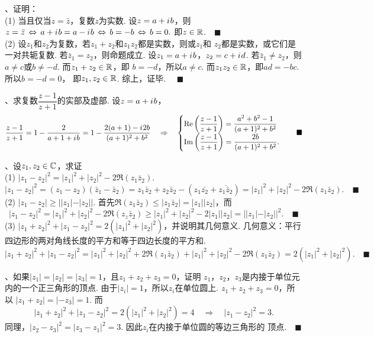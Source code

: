 \vspace{1cm}
\par{}、证明：\\
(1) 当且仅当$z=\bar{z}$，复数$z$为实数.
\proof
  设$z=a+{i\mkern1mu} b$，则
  $
    z=\bar{z}\,\Leftrightarrow\, a+{i\mkern1mu} b = a-{i\mkern1mu} b
    \,\Leftrightarrow\, b = -b \,\Leftrightarrow\, b = 0.
  $
  即$z\in\mathbb{R}$.$\quad\blacksquare$ \\
(2) 设$z_1$和$z_2$为复数，若$z_1+z_2$和$z_1z_2$都是实数，则或$z_1$和
    $z_2$都是实数，或它们是一对共轭复数.
\proof
  若$\bar{z}_1=z_2$，则命题成立. 设$z_1=a+{i\mkern1mu} b$，$z_2=c+{i\mkern1mu} d$.
  若$\bar{z}_1\ne z_2$，则$a\ne c$或$b\ne -d$. 而$z_1+z_2\in\mathbb{R}$，即
  $b = -d$，所以$a\ne c$. 而$z_1z_2\in\mathbb{R}$，即$ad=-bc$. 所以$b=-d=0$，
  即$z_1,z_2\in\mathbb{R}$. 综上，证毕. $\quad\blacksquare$

\vspace{1cm}
\par{}、求复数$\dfrac{z-1}{z+1}$的实部及虚部.
\ans
  设$z=a+{i\mkern1mu} b$，
  \[
    \frac{z-1}{z+1} = 1 - \frac{2}{a+1+{i\mkern1mu} b} =
    1 - \frac{2(a+1) - {i\mkern1mu} 2b}{(a+1)^2 + b^2} \quad\Rightarrow\quad
    \begin{cases}
      \operatorname{Re}\left(\dfrac{z-1}{z+1}\right) = \dfrac{a^2+b^2-1}{(a+1)^2+b^2}\\
      \operatorname{Im}\left(\dfrac{z-1}{z+1}\right) = \dfrac{2b}{(a+1)^2+b^2}.
    \end{cases}\quad\blacksquare
  \]


\vspace{1cm}
\par{}、设$z_1,z_2\in\mathbb{C}$，求证\\
(1) $|z_1-z_2|^2=|z_1|^2+|z_2|^2-2\Re(z_1\bar{z}_2)$.
\proof
  $
    |z_1-z_2|^2 = (z_1-z_2)(\bar{z}_1-\bar{z}_2) =
    z_1\bar{z}_2 + z_2\bar{z}_2 - (z_1\bar{z_2} + \overline{z_1\bar{z}_2})
    = |z_1|^2 + |z_2|^2 - 2\Re(z_1\bar{z}_2).\quad\blacksquare
  $
(2) $|z_1-z_2| \ge ||z_1| - |z_2||$.
\proof
  首先$\Re(z_1\bar{z}_2) \le |z_1\bar{z}_2| = |z_1||z_2|$，而
  \[
    |z_1-z_2|^2 = |z_1|^2 + |z_2|^2 - 2\Re(z_z\bar{z}_2)
    \ge |z_1|^2 + |z_2|^2 - 2|z_1||z_2| = ||z_1|-|z_2||^2.
    \quad\blacksquare
  \]
(3) $|z_1+z_2|^2 + |z_1-z_2|^2 = 2(|z_1|^2 + |z_2|^2)$，并说明其几何意义.
\proof
  几何意义：平行四边形的两对角线长度的平方和等于四边长度的平方和.
  \[
    |z_1+z_2|^2 + |z_1-z_2|^2 = |z_1|^2+|z_2|^2 + 2\Re(z_1\bar{z}_2)
    + |z_1|^2+|z_2|^2 - 2\Re(z_1\bar{z}_2) = 2(|z_1|^2+|z_2|^2).
    \quad\blacksquare
  \]

\vspace{1cm}
\par{}、如果$|z_1|=|z_2|=|z_3|=1$，且$z_1+z_2+z_3=0$，证明
  $z_1$，$z_2$，$z_3$是内接于单位元内的一个正三角形的顶点.
\proof
  由于$|z_i|=1$，所以$z_i$在单位圆上. $z_1+z_2+z_3 = 0$，所以
  $|z_1+z_2| = |-z_3| = 1$. 而
  \[
    |z_1+z_2|^2+|z_1-z_2|^2 = 2(|z_1|^2+|z_2|^2) = 4
    \quad\Rightarrow\quad
    |z_1-z_2|^2 = 3.
  \]
  同理，$|z_2-z_3|^2=|z_3-z_1|^2=3$. 因此$z_i$在内接于单位圆的等边三角形的
  顶点.$\quad\blacksquare$

